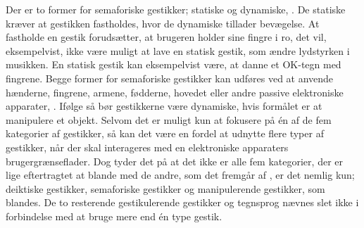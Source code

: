Der er to former for semaforiske gestikker; statiske og dynamiske, \parencite[s. 7]{PDF:ATaxonomyOfGestures}. De statiske kræver at gestikken fastholdes, hvor de dynamiske tillader bevægelse. At fastholde en gestik forudsætter, at brugeren holder sine fingre i ro, det vil, eksempelvist, ikke være muligt at lave en statisk gestik, som ændre lydstyrken i musikken. En statisk gestik kan eksempelvist være, at danne et OK-tegn med fingrene. Begge former for semaforiske gestikker kan udføres ved at anvende hænderne, fingrene, armene, fødderne, hovedet eller andre passive elektroniske apparater, \parencite[s. 7]{PDF:ATaxonomyOfGestures}. Ifølge \textcite[s. 823]{PDF:UnderstandingNaturalness} så bør gestikkerne være dynamiske, hvis formålet er at manipulere et objekt. \blankline
%
Selvom det er muligt kun at fokusere på én af de fem kategorier af gestikker, så kan det være en fordel at udnytte flere typer af gestikker, når der skal interageres med en elektroniske apparaters brugergrænseflader. Dog tyder det på at det ikke er alle fem kategorier, der er lige eftertragtet at blande med de andre, som det fremgår af \textcite[s. 8]{PDF:ATaxonomyOfGestures}, er det nemlig kun; deiktiske gestikker, semaforiske gestikker og manipulerende gestikker, som blandes. De to resterende gestikulerende gestikker og tegnsprog nævnes slet ikke i forbindelse med at bruge mere end én type gestik. 
%
